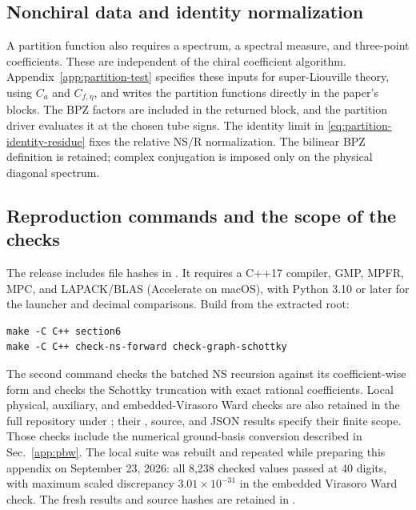 \subsection{Nonchiral data and identity normalization}
\label{app:nonchiral-conventions}

A partition function also requires a spectrum, a spectral measure,
and three-point coefficients. These are independent of the chiral
coefficient algorithm. Appendix~\ref{app:partition-test} specifies
these inputs for super-Liouville theory, using $C_a$ and $C_{f,\eta}$,
and writes the partition functions directly in the paper's blocks.
The BPZ factors are included in the returned block, and the
partition driver evaluates it at the chosen tube signs. The identity limit
in \eqref{eq:partition-identity-residue} fixes the relative NS/R
normalization. The bilinear BPZ definition is retained; complex
conjugation is imposed only on the physical diagonal spectrum.

\subsection{Reproduction commands and the scope of the checks}
\label{app:reproduce}

The release 
includes file hashes in . It requires a
C++17 compiler, GMP, MPFR, MPC, and LAPACK/BLAS (Accelerate on macOS),
with Python 3.10 or later for the launcher and decimal comparisons.
Build from the extracted root:
\begin{verbatim}
make -C C++ section6
make -C C++ check-ns-forward check-graph-schottky
\end{verbatim}
The second command checks the batched NS recursion against its
coefficient-wise form and checks the Schottky truncation with exact
rational coefficients. Local physical, auxiliary, and embedded-Virasoro
Ward checks are also retained in the full repository under
; their
, source, and JSON results specify their finite scope.
Those checks include the numerical ground-basis conversion described
in Sec.~\ref{app:pbw}.
The local suite was rebuilt and repeated while preparing this appendix
on September 23, 2026: all 8,238 checked values passed at 40 digits,
with maximum scaled discrepancy $3.01\times10^{-31}$ in the embedded
Virasoro Ward check. The fresh results and source hashes are retained in
.

